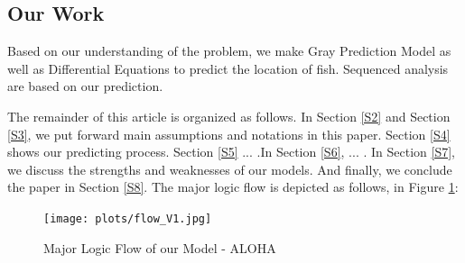 \documentclass{mcmthesis}
\begin{document}
\subsection{Our Work}
	Based on our understanding of the problem, we make Gray Prediction Model as well as Differential Equations to predict the location of fish. Sequenced analysis are based on our prediction.\par
	The remainder of this article is organized as follows. In Section \ref{S2} and Section \ref{S3}, we put forward
main assumptions and notations in this paper. Section \ref{S4} shows our predicting process. Section \ref{S5} ... .In Section \ref{S6}, ... . In Section \ref{S7}, we discuss the strengths
and weaknesses of our models. And finally, we conclude the paper in Section \ref{S8}.
	The major logic flow is depicted as follows, in Figure \ref{fig:flow}:
	
	\begin{figure}[H]
    \centering
    \texttt{[image: plots/flow\_V1.jpg]} %
    \caption{Major Logic Flow of our Model - ALOHA}
    \label{fig:flow}
    \end{figure}
\end{document}

